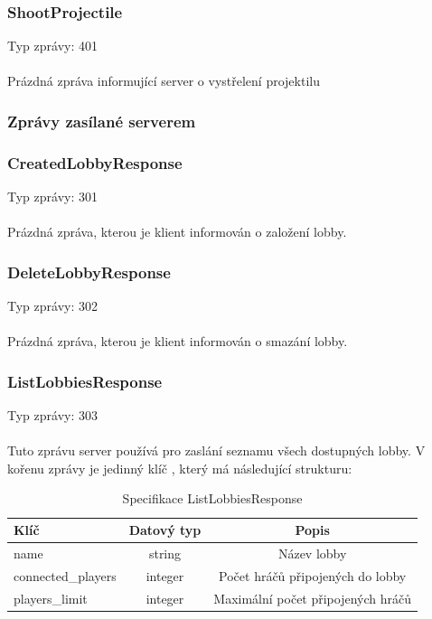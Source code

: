 \documentclass[12pt, a4paper]{article}
\begin{document}
    \subsubsection*{ShootProjectile}
    Typ zprávy: 401\\\\
    Prázdná zpráva informující server o vystřelení projektilu

    \subsubsection{Zprávy zasílané serverem}
    \subsubsection*{CreatedLobbyResponse}
    Typ zprávy: 301\\\\
    Prázdná zpráva, kterou je klient informován o založení lobby.

    \subsubsection*{DeleteLobbyResponse}
    Typ zprávy: 302\\\\
    Prázdná zpráva, kterou je klient informován o smazání lobby.

    \subsubsection*{ListLobbiesResponse}
    Typ zprávy: 303\\\\
    Tuto zprávu server používá pro zaslání seznamu všech dostupných lobby.
    V kořenu zprávy je jedinný klíč , který má následující strukturu:

    \begin{table}[H]
        \centering
        \begin{tabular}{|l|c|c|}
            \hline
            Klíč & Datový typ & Popis\\
            \hline
            \hline
            name & string & Název lobby\\
            \hline
            connected\_players & integer & Počet hráčů připojených do lobby\\
            \hline
            players\_limit & integer & Maximální počet připojených hráčů\\
            \hline
        \end{tabular}
        \caption{Specifikace ListLobbiesResponse}
    \end{table}
\end{document}
